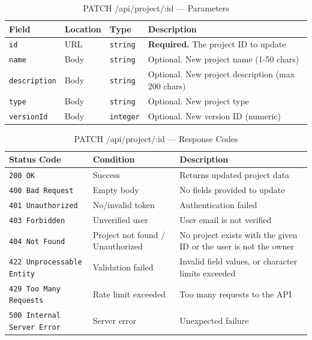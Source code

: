 \begin{table}[H]
\centering
\renewcommand{\arraystretch}{1.3}
\begin{tabularx}{\textwidth}{|l|l|l|X|}
\hline
\textbf{Field} & \textbf{Location} & \textbf{Type} & \textbf{Description} \\
\hline
\texttt{id}          & URL  & \texttt{string}  & \textbf{Required.} The project ID to update \\
\hline
\texttt{name}        & Body & \texttt{string}  & Optional. New project name (1-50 chars) \\
\hline
\texttt{description} & Body & \texttt{string}  & Optional. New project description (max 200 chars) \\
\hline
\texttt{type}        & Body & \texttt{string}  & Optional. New project type \\
\hline
\texttt{versionId}   & Body & \texttt{integer} & Optional. New version ID (numeric) \\
\hline
\end{tabularx}
\caption{PATCH /api/project/:id — Parameters}
\label{tab:update-project-params}
\end{table}

\begin{table}[H]
\centering
\renewcommand{\arraystretch}{1.3}
\begin{tabularx}{\textwidth}{|l|l|X|}
\hline
\textbf{Status Code} & \textbf{Condition} & \textbf{Description} \\
\hline
\texttt{200 OK}           & Success              & Returns updated project data \\
\hline
\texttt{400 Bad Request}  & Empty body           & No fields provided to update \\
\hline
\texttt{401 Unauthorized} & No/invalid token     & Authentication failed \\
\hline
\texttt{403 Forbidden}    & Unverified user & User email is not verified \\
\hline
\texttt{404 Not Found}    & Project not found / Unauthorized  & No project exists with the given ID or the user is not the owner \\
\hline
\texttt{422 Unprocessable Entity} & Validation failed & Invalid field values, or character limits exceeded \\
\hline
\texttt{429 Too Many Requests} & Rate limit exceeded & Too many requests to the API \\
\hline
\texttt{500 Internal Server Error} & Server error & Unexpected failure \\
\hline
\end{tabularx}
\caption{PATCH /api/project/:id — Response Codes}
\label{tab:update-project-responses}
\end{table}
\FloatBarrier


